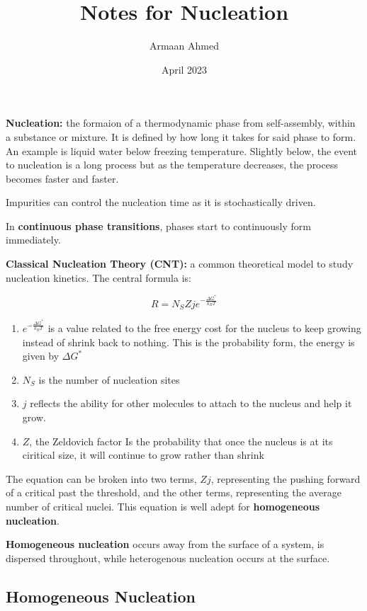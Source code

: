 \documentclass{article}
\title{Notes for Nucleation}
\author{Armaan Ahmed}
\date{April 2023}
\begin{document}
\maketitle

\textbf{Nucleation: } the formaion of a thermodynamic phase from self-assembly, within a substance or mixture. It is defined by how long it takes for said phase to form. An example is liquid water below freezing temperature. Slightly below, the event to nucleation is a long process but as the temperature decreases, the process becomes faster and faster.

Impurities can control the nucleation time as it is stochastically driven.

In \textbf{continuous phase transitions}, phases start to continuously form immediately.

\textbf{Classical Nucleation Theory (CNT): } a common theoretical model to study nucleation kinetics. The central formula is:

\[R=N_S Z j e^{-\frac{\Delta G^*}{k_B T}}\]

\begin{enumerate}
    \item $e^{-\frac{\Delta G^*}{k_B T}}$ is a value related to the free energy cost for the nucleus to keep growing instead of shrink back to nothing. This is the probability form, the energy is given by $\Delta G^*$
    \item $N_S$ is the number of nucleation sites
    \item $j$ reflects the ability for other molecules to attach to the nucleus and help it grow.
    \item $Z$, the Zeldovich factor Is the probability that once the nucleus is at its ciritical size, it will continue to grow rather than shrink
\end{enumerate}

The equation can be broken into two terms, $Zj$, representing the pushing forward of a critical past the threshold, and the other terms, representing the average number of critical nuclei. This equation is well adept for \textbf{homogeneous nucleation}.

\textbf{Homogeneous nucleation} occurs away from the surface of a system, is dispersed throughout, while heterogenous nucleation occurs at the surface.

\subsection{Homogeneous Nucleation}
\end{document}

